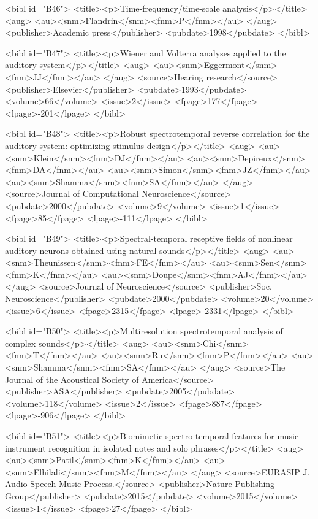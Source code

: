 \documentclass{bmcart}
\begin{document}
\begin{backmatter}
{<bibl id="B46">
  <title><p>Time-frequency/time-scale analysis</p></title>
  <aug>
    <au><snm>Flandrin</snm><fnm>P</fnm></au>
  </aug>
  <publisher>Academic press</publisher>
  <pubdate>1998</pubdate>
</bibl>

<bibl id="B47">
  <title><p>Wiener and Volterra analyses applied to the auditory
  system</p></title>
  <aug>
    <au><snm>Eggermont</snm><fnm>JJ</fnm></au>
  </aug>
  <source>Hearing research</source>
  <publisher>Elsevier</publisher>
  <pubdate>1993</pubdate>
  <volume>66</volume>
  <issue>2</issue>
  <fpage>177</fpage>
  <lpage>-201</lpage>
</bibl>

<bibl id="B48">
  <title><p>Robust spectrotemporal reverse correlation for the auditory system:
  optimizing stimulus design</p></title>
  <aug>
    <au><snm>Klein</snm><fnm>DJ</fnm></au>
    <au><snm>Depireux</snm><fnm>DA</fnm></au>
    <au><snm>Simon</snm><fnm>JZ</fnm></au>
    <au><snm>Shamma</snm><fnm>SA</fnm></au>
  </aug>
  <source>Journal of Computational Neuroscience</source>
  <pubdate>2000</pubdate>
  <volume>9</volume>
  <issue>1</issue>
  <fpage>85</fpage>
  <lpage>-111</lpage>
</bibl>

<bibl id="B49">
  <title><p>Spectral-temporal receptive fields of nonlinear auditory neurons
  obtained using natural sounds</p></title>
  <aug>
    <au><snm>Theunissen</snm><fnm>FE</fnm></au>
    <au><snm>Sen</snm><fnm>K</fnm></au>
    <au><snm>Doupe</snm><fnm>AJ</fnm></au>
  </aug>
  <source>Journal of Neuroscience</source>
  <publisher>Soc. Neuroscience</publisher>
  <pubdate>2000</pubdate>
  <volume>20</volume>
  <issue>6</issue>
  <fpage>2315</fpage>
  <lpage>-2331</lpage>
</bibl>

<bibl id="B50">
  <title><p>Multiresolution spectrotemporal analysis of complex
  sounds</p></title>
  <aug>
    <au><snm>Chi</snm><fnm>T</fnm></au>
    <au><snm>Ru</snm><fnm>P</fnm></au>
    <au><snm>Shamma</snm><fnm>SA</fnm></au>
  </aug>
  <source>The Journal of the Acoustical Society of America</source>
  <publisher>ASA</publisher>
  <pubdate>2005</pubdate>
  <volume>118</volume>
  <issue>2</issue>
  <fpage>887</fpage>
  <lpage>-906</lpage>
</bibl>

<bibl id="B51">
  <title><p>Biomimetic spectro-temporal features for music instrument
  recognition in isolated notes and solo phrases</p></title>
  <aug>
    <au><snm>Patil</snm><fnm>K</fnm></au>
    <au><snm>Elhilali</snm><fnm>M</fnm></au>
  </aug>
  <source>EURASIP J. Audio Speech Music Process.</source>
  <publisher>Nature Publishing Group</publisher>
  <pubdate>2015</pubdate>
  <volume>2015</volume>
  <issue>1</issue>
  <fpage>27</fpage>
</bibl>

}
\end{backmatter}
\end{document}
